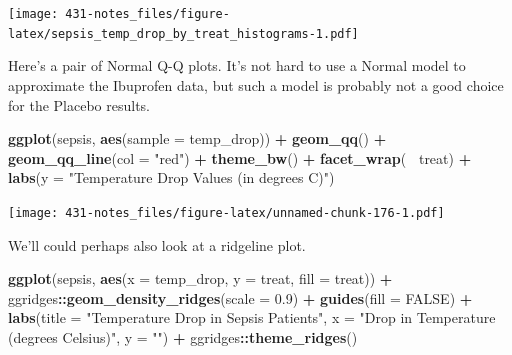 \documentclass[
]{book}
\newenvironment{Shaded}{\begin{snugshade}}{\end{snugshade}}
\newcommand{\DataTypeTok}[1]{\textcolor[rgb]{0.13,0.29,0.53}{#1}}
\newcommand{\FloatTok}[1]{\textcolor[rgb]{0.00,0.00,0.81}{#1}}
\newcommand{\KeywordTok}[1]{\textcolor[rgb]{0.13,0.29,0.53}{\textbf{#1}}}
\newcommand{\NormalTok}[1]{#1}
\newcommand{\OperatorTok}[1]{\textcolor[rgb]{0.81,0.36,0.00}{\textbf{#1}}}
\newcommand{\OtherTok}[1]{\textcolor[rgb]{0.56,0.35,0.01}{#1}}
\newcommand{\StringTok}[1]{\textcolor[rgb]{0.31,0.60,0.02}{#1}}
\begin{document}
\texttt{[image: 431-notes\_files/figure-latex/sepsis\_temp\_drop\_by\_treat\_histograms-1.pdf]}

Here's a pair of Normal Q-Q plots. It's not hard to use a Normal model to approximate the Ibuprofen data, but such a model is probably not a good choice for the Placebo results.

\begin{Shaded}
\begin{Highlighting}[]
\KeywordTok{ggplot}\NormalTok{(sepsis, }\KeywordTok{aes}\NormalTok{(}\DataTypeTok{sample =}\NormalTok{ temp_drop)) }\OperatorTok{+}
\StringTok{    }\KeywordTok{geom_qq}\NormalTok{() }\OperatorTok{+}\StringTok{ }\KeywordTok{geom_qq_line}\NormalTok{(}\DataTypeTok{col =} \StringTok{"red"}\NormalTok{) }\OperatorTok{+}
\StringTok{    }\KeywordTok{theme_bw}\NormalTok{() }\OperatorTok{+}
\StringTok{    }\KeywordTok{facet_wrap}\NormalTok{(}\OperatorTok{~}\StringTok{ }\NormalTok{treat) }\OperatorTok{+}\StringTok{ }
\StringTok{    }\KeywordTok{labs}\NormalTok{(}\DataTypeTok{y =} \StringTok{"Temperature Drop Values (in degrees C)"}\NormalTok{)}
\end{Highlighting}
\end{Shaded}

\texttt{[image: 431-notes\_files/figure-latex/unnamed-chunk-176-1.pdf]}

We'll could perhaps also look at a ridgeline plot.

\begin{Shaded}
\begin{Highlighting}[]
\KeywordTok{ggplot}\NormalTok{(sepsis, }\KeywordTok{aes}\NormalTok{(}\DataTypeTok{x =}\NormalTok{ temp_drop, }\DataTypeTok{y =}\NormalTok{ treat, }\DataTypeTok{fill =}\NormalTok{ treat)) }\OperatorTok{+}
\StringTok{    }\NormalTok{ggridges}\OperatorTok{::}\KeywordTok{geom_density_ridges}\NormalTok{(}\DataTypeTok{scale =} \FloatTok{0.9}\NormalTok{) }\OperatorTok{+}
\StringTok{    }\KeywordTok{guides}\NormalTok{(}\DataTypeTok{fill =} \OtherTok{FALSE}\NormalTok{) }\OperatorTok{+}\StringTok{ }
\StringTok{    }\KeywordTok{labs}\NormalTok{(}\DataTypeTok{title =} \StringTok{"Temperature Drop in Sepsis Patients"}\NormalTok{,}
         \DataTypeTok{x =} \StringTok{"Drop in Temperature (degrees Celsius)"}\NormalTok{, }\DataTypeTok{y =} \StringTok{""}\NormalTok{) }\OperatorTok{+}
\StringTok{    }\NormalTok{ggridges}\OperatorTok{::}\KeywordTok{theme_ridges}\NormalTok{()}
\end{Highlighting}
\end{Shaded}
\end{document}
